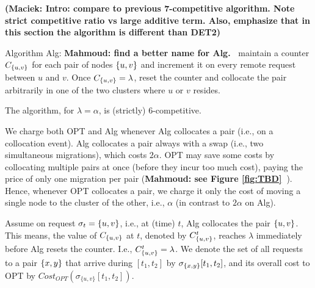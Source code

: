 \documentclass[manuscript,screen=true, review, anonymous]{acmart}
\DeclarePairedDelimiter\set{\{}{\}}
\newcommand\mahmoud[1]{\color{orange}\textbf{Mahmoud: #1~}\color{black}}
\newcommand\maciek[1]{\color{brown}\textbf{(Maciek: #1)}\color{black}}
\begin{document}
\maciek{Intro: compare to previous 7-competitive algorithm. Note strict competitive ratio vs large additive term. Also, emphasize that in this section the algorithm is different than DET2}

Algorithm Alg:
\mahmoud{find a better name for Alg.}
maintain a counter $C_{\set{u,v}}$ for each pair of nodes $\set{u,v}$ and increment it on every remote request between $u$ and $v$.
Once $C_{\set{u,v}} = \lambda$,
reset the counter and collocate the pair arbitrarily in one of the two clusters where $u$ or $v$ resides.

\begin{theorem} \label{thm:k=2}
	The algorithm, for $\lambda=\alpha$, is (strictly) 6-competitive.
\end{theorem}


We charge both OPT and Alg whenever Alg collocates a pair (i.e., on a collocation event).
Alg collocates a pair always with a swap (i.e., two simultaneous migrations),
which  costs $2\alpha$.
OPT may save some costs by collocating multiple pairs at once (before they incur too much cost),
paying the price of only one migration per pair  (\mahmoud{see Figure \ref{fig:TBD}}).
Hence,
whenever OPT collocates a pair,
we charge it only the cost of moving a single node to the cluster of the other,
i.e., $\alpha$ (in contrast to $2\alpha$ on Alg).

Assume on request $\sigma_{t}=\set{u,v}$, 
i.e., at (time) $t$,
Alg collocates the pair $\set{u,v}$.
This means,
the value of $C_{\set{u,v}}$ at $t$,
denoted by $C^t_{\set{u,v}}$, 
reaches $\lambda$ immediately before Alg resets the counter.
I.e.,
$ C^t_{\set{u,v}} = \lambda$.
We denote the set of all requests to a pair $\set{x,y}$ that arrive
during $[t_1,t_2]$ by $\sigma_{\set{x,y}}[t_1,t_2]$,
and its overall cost to OPT by
$\mathit{Cost}_{\mathit{OPT}} (\sigma_{\{u,v\}}[t_1,t_2])$.
%
\end{document}
